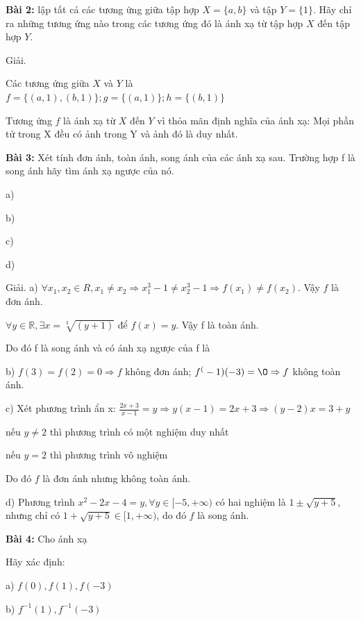 \documentclass[12pt,oneside,a4paper,reqno]{book}
\begin{document}
\textbf{Bài 2: }lập tất cả các tương ứng giữa tập hợp $X=\{a,b\}$ và tập $Y=\{1\}$. Hãy chỉ ra những tương ứng nào trong các tương ứng đó là ánh xạ từ tập hợp $X$ đến tập hợp $Y$.

Giải.

Các tương ứng giữa $X$ và $Y$ là $f=\{(a,1),(b,1)\}  ;g=\{(a,1)\}  ;h=\{(b,1)\}$

Tương ứng $f$ là ánh xạ từ $X$ đến $Y$ vì thỏa mãn định nghĩa của ánh xạ: Mọi phần tử trong X đều có ảnh trong Y và ảnh đó là duy nhất.

\textbf{Bài 3:} Xét tính đơn ánh, toàn ánh, song ánh của các ánh xạ sau. Trường hợp f là song ánh hãy tìm ánh xạ ngược của nó.

a) 

b) 

c) 

d) \fullfunction{f}{[1,+\infty)}{[-5,+\infty)}{x}{x^2-2x-4}

Giải.
a)
$\forall x_1,x_2\in R,x_1\neq x_2 \Rightarrow x_1^3-1\neq x_2^3-1 \Rightarrow f(x_1 )\neq f(x_2 )$. Vậy $f$ là đơn ánh.

$\forall y\in \mathbb{R}, \exists x=\sqrt[3]{(y+1)}$  để $f(x)=y$. Vậy f là toàn ánh.

Do đó f là song ánh và có ánh xạ ngược của f là 


b) $f(3)=f(2)=0\Rightarrow f$ không đơn ánh; $f^(-1) (-3)=\O \Rightarrow f$ không toàn ánh.

c) Xét phương trình ẩn x: $\frac{2x+3}{x-1} =y \Rightarrow y(x-1)=2x+3\Rightarrow (y-2)x=3+y$

nếu $y\neq 2$ thì phương trình có một nghiệm duy nhất

nếu $y=2$ thì phương trình vô nghiệm

Do đó $f$ là đơn ánh nhưng không toàn ánh.

d) Phương trình $x^2-2x-4=y,\forall y\in [-5,+\infty)$  có hai nghiệm là $1\pm \sqrt{y+5}$, nhưng chỉ có $1+\sqrt{y+5}\in [1,+\infty)$, do đó $f$ là song ánh.

\textbf{Bài 4: } Cho ánh xạ 

Hãy xác định:

a) $f(0),f(1),f(-3)$

b) $f^{-1} (1),f^{-1} (-3)$
\end{document}
